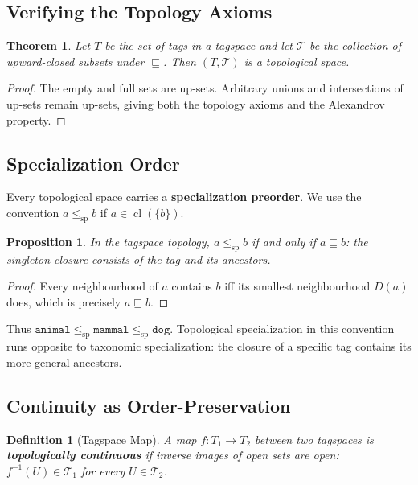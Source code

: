 \documentclass{article}
\newtheorem{definition}{Definition}[section]
\newtheorem{theorem}{Theorem}[section]
\newtheorem{proposition}{Proposition}[section]
\begin{document}
\subsection{Verifying the Topology Axioms}

\begin{theorem}
Let $T$ be the set of tags in a tagspace and let $\mathcal{T}$ be the
collection of upward-closed subsets under $\sqsubseteq$. Then
$(T, \mathcal{T})$ is a topological space.
\end{theorem}

\begin{proof}
The empty and full sets are up-sets. Arbitrary unions and intersections of
up-sets remain up-sets, giving both the topology axioms and the Alexandrov property.
\end{proof}

\subsection{Specialization Order}

Every topological space carries a \textbf{specialization preorder}. We use
the convention $a\leq_{\mathrm{sp}}b$ if
$a\in\operatorname{cl}(\{b\})$.

\begin{proposition}
In the tagspace topology, $a\leq_{\mathrm{sp}}b$ if and only if
$a\sqsubseteq b$: the singleton closure consists of the tag and its ancestors.
\end{proposition}
\begin{proof}
Every neighbourhood of $a$ contains $b$ iff its smallest neighbourhood $D(a)$
does, which is precisely $a\sqsubseteq b$.
\end{proof}

Thus $\texttt{animal}\leq_{\mathrm{sp}}\texttt{mammal}
\leq_{\mathrm{sp}}\texttt{dog}$. Topological specialization in this
convention runs opposite to taxonomic specialization: the closure of a
specific tag contains its more general ancestors.

\subsection{Continuity as Order-Preservation}

\begin{definition}[Tagspace Map]
A map $f : T_1 \to T_2$ between two tagspaces is \textbf{topologically
continuous} if inverse images of open sets are open: $f^{-1}(U) \in \mathcal{T}_1$ for
every $U \in \mathcal{T}_2$.
\end{definition}
\end{document}
